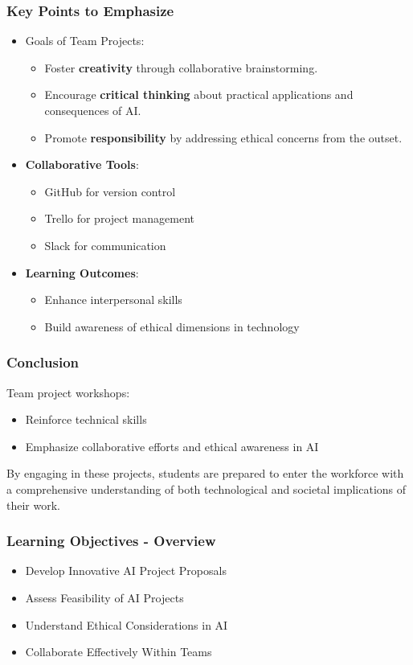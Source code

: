 \documentclass[aspectratio=169]{beamer}
\begin{document}
\begin{frame}[fragile]
    \frametitle{Key Points to Emphasize}
    \begin{itemize}
        \item Goals of Team Projects:
        \begin{itemize}
            \item Foster \textbf{creativity} through collaborative brainstorming.
            \item Encourage \textbf{critical thinking} about practical applications and consequences of AI.
            \item Promote \textbf{responsibility} by addressing ethical concerns from the outset.
        \end{itemize}
        
        \item \textbf{Collaborative Tools}:
        \begin{itemize}
            \item GitHub for version control
            \item Trello for project management
            \item Slack for communication
        \end{itemize}
        
        \item \textbf{Learning Outcomes}:
        \begin{itemize}
            \item Enhance interpersonal skills
            \item Build awareness of ethical dimensions in technology
        \end{itemize}
    \end{itemize}
\end{frame}

\begin{frame}[fragile]
    \frametitle{Conclusion}
    Team project workshops:
    \begin{itemize}
        \item Reinforce technical skills
        \item Emphasize collaborative efforts and ethical awareness in AI
    \end{itemize}
    By engaging in these projects, students are prepared to enter the workforce with a comprehensive understanding of both technological and societal implications of their work.
\end{frame}

\begin{frame}[fragile]
    \frametitle{Learning Objectives - Overview}
    \begin{itemize}
        \item Develop Innovative AI Project Proposals
        \item Assess Feasibility of AI Projects
        \item Understand Ethical Considerations in AI
        \item Collaborate Effectively Within Teams
    \end{itemize}
\end{frame}
\end{document}
